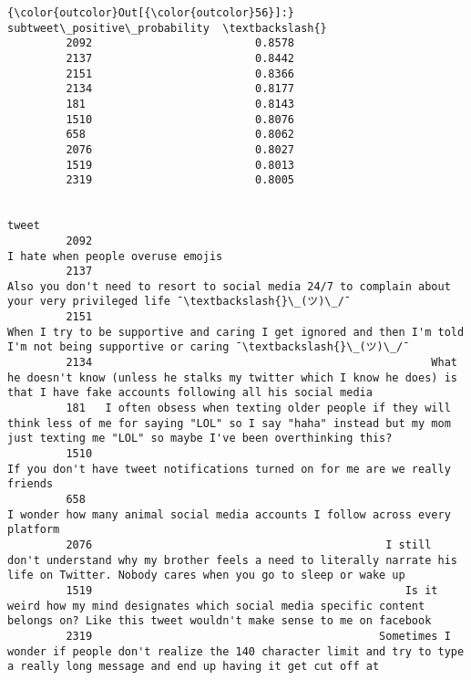 \documentclass[11pt]{article}
\begin{document}
\begin{Verbatim}[commandchars=\\\{\}]
{\color{outcolor}Out[{\color{outcolor}56}]:}       subtweet\_positive\_probability  \textbackslash{}
         2092                         0.8578   
         2137                         0.8442   
         2151                         0.8366   
         2134                         0.8177   
         181                          0.8143   
         1510                         0.8076   
         658                          0.8062   
         2076                         0.8027   
         1519                         0.8013   
         2319                         0.8005   
         
                                                                                                                                                                                                tweet  
         2092                                                                                                                                                       I hate when people overuse emojis  
         2137                                                                                Also you don't need to resort to social media 24/7 to complain about your very privileged life ¯\textbackslash{}\_(ツ)\_/¯  
         2151                                                                     When I try to be supportive and caring I get ignored and then I'm told I'm not being supportive or caring ¯\textbackslash{}\_(ツ)\_/¯  
         2134                                                    What he doesn't know (unless he stalks my twitter which I know he does) is that I have fake accounts following all his social media   
         181   I often obsess when texting older people if they will think less of me for saying "LOL" so I say "haha" instead but my mom just texting me "LOL" so maybe I've been overthinking this?  
         1510                                                                                                            If you don't have tweet notifications turned on for me are we really friends  
         658                                                                                                            I wonder how many animal social media accounts I follow across every platform  
         2076                                             I still don't understand why my brother feels a need to literally narrate his life on Twitter. Nobody cares when you go to sleep or wake up  
         1519                                                Is it weird how my mind designates which social media specific content belongs on? Like this tweet wouldn't make sense to me on facebook  
         2319                                            Sometimes I wonder if people don't realize the 140 character limit and try to type a really long message and end up having it get cut off at  
\end{Verbatim}
            
\end{document}
